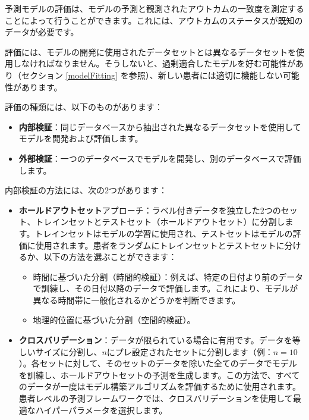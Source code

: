 \documentclass[
  11pt]{book}
\makeatletter
\providecommand{\tightlist}{%
  \setlength{\itemsep}{0pt}\setlength{\parskip}{0pt}}
\newenvironment{kframe}{%
\medskip{}
\setlength{\fboxsep}{.8em}
 \def\at@end@of@kframe{}%
 \ifinner\ifhmode%
  \def\at@end@of@kframe{\end{minipage}}%
  \begin{minipage}{\columnwidth}%
 \fi\fi%
 \def\FrameCommand##1{\hskip\@totalleftmargin \hskip-\fboxsep
 \colorbox{myShadeColor}{##1}\hskip-\fboxsep
     \hskip-\linewidth \hskip-\@totalleftmargin \hskip\columnwidth}%
 \MakeFramed {\advance\hsize-\width
   \@totalleftmargin\z@ \linewidth\hsize
   \@setminipage}}%
 {\par\unskip\endMakeFramed%
 \at@end@of@kframe}
\newenvironment{rmdblock}[1]
  {
  \begin{itemize}
  \renewcommand{\labelitemi}{
    \raisebox{-.7\height}[0pt][0pt]{
      {\setkeys{Gin}{width=3em,keepaspectratio}\texttt{[image: images/\#1]}}
    }
  }
  \setlength{\fboxsep}{1em}
  \begin{kframe}
  \item
  }
  {
  \end{kframe}
  \end{itemize}
  }
\newenvironment{rmdimportant}
  {\begin{rmdblock}{important}}
  {\end{rmdblock}}
\theoremstyle{definition}
\theoremstyle{definition}
\theoremstyle{definition}
\theoremstyle{definition}
\theoremstyle{remark}
\makeatother
\begin{document}
予測モデルの評価は、モデルの予測と観測されたアウトカムの一致度を測定することによって行うことができます。これには、アウトカムのステータスが既知のデータが必要です。 

\begin{rmdimportant}
評価には、モデルの開発に使用されたデータセットとは異なるデータセットを使用しなければなりません。そうしないと、過剰適合したモデルを好む可能性があり（セクション \ref{modelFitting} を参照）、新しい患者には適切に機能しない可能性があります。
\end{rmdimportant}

評価の種類には、以下のものがあります：

\begin{itemize}
\tightlist
\item
  \textbf{内部検証}：同じデータベースから抽出された異なるデータセットを使用してモデルを開発および評価します。
\item
  \textbf{外部検証}：一つのデータベースでモデルを開発し、別のデータベースで評価します。  
\end{itemize}

内部検証の方法には、次の2つがあります：

\begin{itemize}
\tightlist
\item
  \textbf{ホールドアウトセット}アプローチ：ラベル付きデータを独立した2つのセット、トレインセットとテストセット（ホールドアウトセット）に分割します。トレインセットはモデルの学習に使用され、テストセットはモデルの評価に使用されます。患者をランダムにトレインセットとテストセットに分けるか、以下の方法を選ぶことができます：

  \begin{itemize}
  \tightlist
  \item
    時間に基づいた分割（時間的検証）：例えば、特定の日付より前のデータで訓練し、その日付以降のデータで評価します。これにより、モデルが異なる時間帯に一般化されるかどうかを判断できます。
  \item
    地理的位置に基づいた分割（空間的検証）。 
  \end{itemize}
\item
  \textbf{クロスバリデーション}：データが限られている場合に有用です。データを等しいサイズに分割し、\(n\)にプレ設定されたセットに分割します（例：\(n=10\)）。各セットに対して、そのセットのデータを除いた全てのデータでモデルを訓練し、ホールドアウトセットの予測を生成します。この方法で、すべてのデータが一度はモデル構築アルゴリズムを評価するために使用されます。患者レベルの予測フレームワークでは、クロスバリデーションを使用して最適なハイパーパラメータを選択します。 
\end{itemize}
\end{document}
